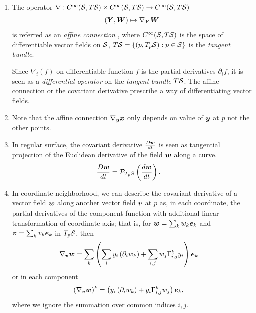 \documentclass[11pt]{article}
\begin{document}
\begin{enumerate}
\item The operator $\nabla: C^{\infty}({\mathcal S}, T{\mathcal S}) \times C^{\infty}({\mathcal S}, T{\mathcal S})\rightarrow C^{\infty}({\mathcal S}, T{\mathcal S})$ 
\begin{align*}
(\boldsymbol{Y}, \boldsymbol{W})\mapsto \nabla_{\boldsymbol{Y}}\boldsymbol{W}
\end{align*} is referred as an \emph{affine connection} \citep{do1992riemannian, murray1993differential}, where $C^{\infty}({\mathcal S}, T{\mathcal S})$ is the space of differentiable vector fields on ${\mathcal S}$, $T{\mathcal S} = \left\{(p,T_{p}{\mathcal S}): p\in {\mathcal S}\right\}$ is the \emph{tangent bundle}.

Since $\nabla_{i}(f)$ on differentiable function $f$ is the partial derivatives $\partial_{i} f$, it is seen as a \emph{differential operator} on the \emph{tangent bundle} $T{\mathcal S}$. The affine connection or the covariant derivative prescribe a way of differentiating vector fields. 

\item Note that the affine connection $\nabla_{\boldsymbol{y}}\boldsymbol{x}$ only depends on value of $\boldsymbol{y}$ at $p$ not the other points. \\[5pt]

\item In regular surface, the covariant derivative $\frac{D\boldsymbol{w}}{dt}$ is seen as tangential projection of the Euclidean derivative of the field $\boldsymbol{w}$ along a curve. 
\begin{align*}
\frac{D\boldsymbol{w}}{dt} &= \mathcal{P}_{T_{p}S}\left(\frac{d\boldsymbol{w}}{dt} \right).
\end{align*}

\item In coordinate neighborhood, we can describe the covariant derivative of a vector field $\boldsymbol{w}$ along another vector field $\boldsymbol{v}$ at $p$ as, in each coordinate, the partial derivatives of the component function with additional linear transformation of coordinate axis; that is, for $\boldsymbol{w} = \sum_{k}w_{k}\boldsymbol{e}_{k}$ and $\boldsymbol{v} = \sum_{k}v_{k}\boldsymbol{e}_{k}$ in $T_{p}{\mathcal S}$, then 
\begin{align*}
\nabla_{\boldsymbol{v}}\boldsymbol{w} &=\sum_{k} \left( \sum_{i}y_{i}\left(\partial_{i}w_{k}\right) + \sum_{i,j}w_{j}\Gamma_{i,j}^{k}y_{i} \right)\boldsymbol{e}_{k}
\end{align*}
or in each component 
\begin{align*}
(\nabla_{\boldsymbol{v}}\boldsymbol{w})^{k} &= \left(y_{i}\left(\partial_{i}w_{k}\right) + y_{i}\Gamma_{i,j}^{k}w_{j} \right)\boldsymbol{e}_{k},
\end{align*}
where we ignore the summation over common indices $i,j$.


\end{enumerate}
\end{document}
